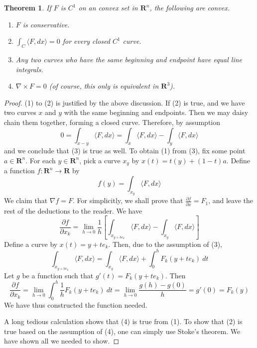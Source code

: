 \documentclass[12pt]{amsbook}
\theoremstyle{plain}
\newtheorem{theorem}{Theorem}
\theoremstyle{definition}
\begin{document}
\begin{theorem}
    If $F$ is $C^1$ on an convex set in $\mathbf{R}^n$, the following are convex.
    \begin{enumerate}
        \item $F$ is conservative.
        \item $\int_C \langle F, dx \rangle = 0$ for every closed $C^1$ curve.
        \item Any two curves who have the same beginning and endpoint have equal line integrals.
        \item $\nabla \times F = 0$ (of course, this only is equivalent in $\mathbf{R}^3$).
    \end{enumerate}
\end{theorem}
\begin{proof}
    (1) to (2) is justified by the above discussion. If (2) is true, and we have two curves $x$ and $y$ with the same beginning and endpoints. Then we may daisy chain them together, forming a closed curve. Therefore, by assumption
    \[ 0 = \int_{x - y} \langle F, dx \rangle = \int_x \langle F, dx \rangle - \int_y \langle F, dx \rangle  \]
    and we conclude that (3) is true as well. To obtain (1) from (3), fix some point $a \in \mathbf{R}^n$. For each $y \in \mathbf{R}^n$, pick a curve $x_y$ by $x(t) = t(y) + (1-t)a$. Define a function $f:\mathbf{R}^n \to \mathbf{R}$ by
    \[ f(y) = \int_{x_y} \langle F, dx \rangle \]
    We claim that $\nabla f = F$. For simplicitly, we shall prove that $\frac{\partial f}{\partial x} = F_1$, and leave the rest of the deductions to the reader. We have
    \[ \frac{\partial f}{\partial x_k} = \lim_{h \to 0} \frac{1}{h} \left[ \int_{x_{y+he_k}} \langle F, dx \rangle - \int_{x_y} \langle F, dx \rangle \right] \]
    Define a curve by $x(t) = y + te_k$. Then, due to the assumption of (3),
    \[ \int_{x_{y + he_k}} \langle F, dx \rangle = \int_{x_y} \langle F, dx \rangle + \int_0^h F_k(y + te_k)\ dt \]
    Let $g$ be a function such that $g'(t) = F_k(y + te_k)$. Then
    \[ \frac{\partial f}{\partial x_k} = \lim_{h \to 0} \int_0^h \frac{1}{h} F_k(y + te_k)\ dt = \lim_{h \to 0} \frac{g(h) - g(0)}{h} = g'(0) = F_k(y) \]
    We have thus constructed the function needed.

    A long tedious calculation shows that (4) is true from (1). To show that (2) is true based on the assumption of (4), one can simply use Stoke's theorem. We have shown all we needed to show.
\end{proof}
\end{document}
